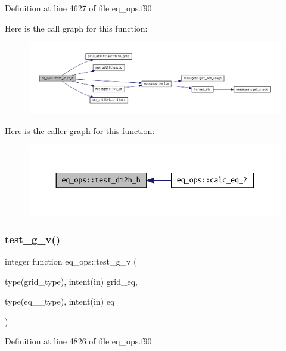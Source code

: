 Definition at line 4627 of file eq\+\_\+ops.\+f90.

Here is the call graph for this function\+:
\nopagebreak
\begin{figure}[H]
\begin{center}
\leavevmode
\includegraphics[width=350pt]{namespaceeq__ops_a003df1e1ab90dc6f586c3eed3dd067e8_cgraph}
\end{center}
\end{figure}
Here is the caller graph for this function\+:
\nopagebreak
\begin{figure}[H]
\begin{center}
\leavevmode
\includegraphics[width=350pt]{namespaceeq__ops_a003df1e1ab90dc6f586c3eed3dd067e8_icgraph}
\end{center}
\end{figure}
\mbox{\label{namespaceeq__ops_a9811c83477d9d85f7401fd7957a590fc}} 
\subsubsection{\texorpdfstring{test\+\_\+g\+\_\+v()}{test\_g\_v()}}
{\footnotesize\ttfamily integer function eq\+\_\+ops\+::test\+\_\+g\+\_\+v (\begin{DoxyParamCaption}\item[{type(grid\+\_\+type), intent(in)}]{grid\+\_\+eq,  }\item[{type(eq\+\_\+2\+\_\+type), intent(in)}]{eq }\end{DoxyParamCaption})}



Definition at line 4826 of file eq\+\_\+ops.\+f90.

